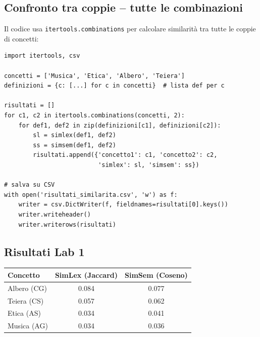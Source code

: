 \documentclass[12pt,a4paper]{article}
\begin{document}
\subsection{Confronto tra coppie -- tutte le combinazioni}

Il codice usa \texttt{itertools.combinations} per calcolare similarit\`a tra tutte le coppie di concetti:

\begin{codebox}
\begin{lstlisting}[style=python]
import itertools, csv

concetti = ['Musica', 'Etica', 'Albero', 'Teiera']
definizioni = {c: [...] for c in concetti}  # lista def per c

risultati = []
for c1, c2 in itertools.combinations(concetti, 2):
    for def1, def2 in zip(definizioni[c1], definizioni[c2]):
        sl = simlex(def1, def2)
        ss = simsem(def1, def2)
        risultati.append({'concetto1': c1, 'concetto2': c2,
                          'simlex': sl, 'simsem': ss})

# salva su CSV
with open('risultati_similarita.csv', 'w') as f:
    writer = csv.DictWriter(f, fieldnames=risultati[0].keys())
    writer.writeheader()
    writer.writerows(risultati)
\end{lstlisting}
\end{codebox}

\subsection{Risultati Lab 1}

\begin{resultbox}
\begin{center}
\begin{tabular}{lcc}
\toprule
\textbf{Concetto} & \textbf{SimLex (Jaccard)} & \textbf{SimSem (Coseno)} \\
\midrule
Albero (CG)  & 0.084 & 0.077 \\
Teiera (CS)  & 0.057 & 0.062 \\
Etica (AS)   & 0.034 & 0.041 \\
Musica (AG)  & 0.034 & 0.036 \\
\bottomrule
\end{tabular}
\end{center}
\end{resultbox}
\end{document}
